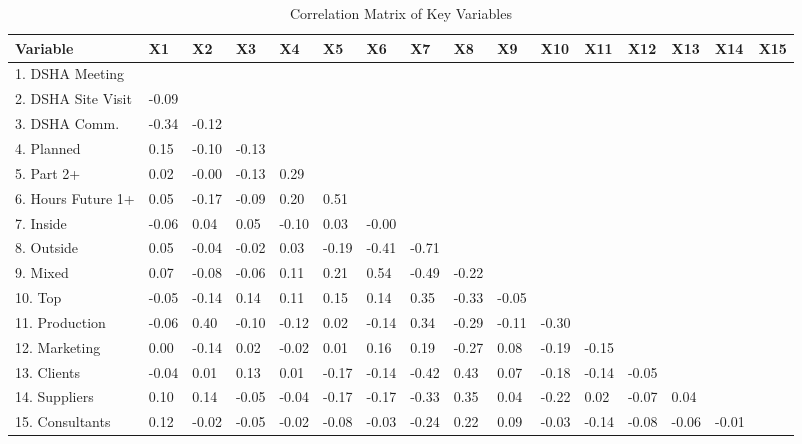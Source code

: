 \begin{table}[ht]
\centering
\begin{tabular}{llllllllllllllll}
  \hline
Variable & X1 & X2 & X3 & X4 & X5 & X6 & X7 & X8 & X9 & X10 & X11 & X12 & X13 & X14 & X15 \\ 
  \hline
1. DSHA Meeting &  &  &  &  &  &  &  &  &  &  &  &  &  &  &  \\ 
  2. DSHA Site Visit & -0.09 &  &  &  &  &  &  &  &  &  &  &  &  &  &  \\ 
  3. DSHA Comm. & -0.34 & -0.12 &  &  &  &  &  &  &  &  &  &  &  &  &  \\ 
  4. Planned & 0.15 & -0.10 & -0.13 &  &  &  &  &  &  &  &  &  &  &  &  \\ 
  5. Part 2+ & 0.02 & -0.00 & -0.13 & 0.29 &  &  &  &  &  &  &  &  &  &  &  \\ 
  6. Hours Future 1+ & 0.05 & -0.17 & -0.09 & 0.20 & 0.51 &  &  &  &  &  &  &  &  &  &  \\ 
  7. Inside & -0.06 & 0.04 & 0.05 & -0.10 & 0.03 & -0.00 &  &  &  &  &  &  &  &  &  \\ 
  8. Outside & 0.05 & -0.04 & -0.02 & 0.03 & -0.19 & -0.41 & -0.71 &  &  &  &  &  &  &  &  \\ 
  9. Mixed & 0.07 & -0.08 & -0.06 & 0.11 & 0.21 & 0.54 & -0.49 & -0.22 &  &  &  &  &  &  &  \\ 
  10. Top & -0.05 & -0.14 & 0.14 & 0.11 & 0.15 & 0.14 & 0.35 & -0.33 & -0.05 &  &  &  &  &  &  \\ 
  11. Production & -0.06 & 0.40 & -0.10 & -0.12 & 0.02 & -0.14 & 0.34 & -0.29 & -0.11 & -0.30 &  &  &  &  &  \\ 
  12. Marketing & 0.00 & -0.14 & 0.02 & -0.02 & 0.01 & 0.16 & 0.19 & -0.27 & 0.08 & -0.19 & -0.15 &  &  &  &  \\ 
  13. Clients & -0.04 & 0.01 & 0.13 & 0.01 & -0.17 & -0.14 & -0.42 & 0.43 & 0.07 & -0.18 & -0.14 & -0.05 &  &  &  \\ 
  14. Suppliers & 0.10 & 0.14 & -0.05 & -0.04 & -0.17 & -0.17 & -0.33 & 0.35 & 0.04 & -0.22 & 0.02 & -0.07 & 0.04 &  &  \\ 
  15. Consultants & 0.12 & -0.02 & -0.05 & -0.02 & -0.08 & -0.03 & -0.24 & 0.22 & 0.09 & -0.03 & -0.14 & -0.08 & -0.06 & -0.01 &  \\ 
   \hline
\end{tabular}
\caption{Correlation Matrix of Key Variables} 
\label{tab:correlations}
\end{table}
